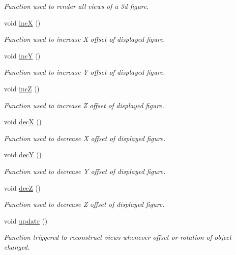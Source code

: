 \begin{DoxyCompactItemize}
\begin{DoxyCompactList}\small\item\em Function used to render all views of a 3d figure. \end{DoxyCompactList}\item 
void \hyperlink{classMainWindow_a6ae88293630f79a3ccb75bc5e64daea5}{incX} ()
\begin{DoxyCompactList}\small\item\em Function used to increase X offset of displayed figure. \end{DoxyCompactList}\item 
void \hyperlink{classMainWindow_ad4fa62f605231f2c935f37f7a204bbf9}{incY} ()
\begin{DoxyCompactList}\small\item\em Function used to increase Y offset of displayed figure. \end{DoxyCompactList}\item 
void \hyperlink{classMainWindow_a25ae6019ab87c5e9bf844ac007b00249}{incZ} ()
\begin{DoxyCompactList}\small\item\em Function used to increase Z offset of displayed figure. \end{DoxyCompactList}\item 
void \hyperlink{classMainWindow_a4c4ad4dbc9064c0bdbdb5f9ba619a6c2}{decX} ()
\begin{DoxyCompactList}\small\item\em Function used to decrease X offset of displayed figure. \end{DoxyCompactList}\item 
void \hyperlink{classMainWindow_aeab655f19703fca45999fc3cb11b6bd0}{decY} ()
\begin{DoxyCompactList}\small\item\em Function used to decrease Y offset of displayed figure. \end{DoxyCompactList}\item 
void \hyperlink{classMainWindow_a5841a993bb0167306794580058c435e2}{decZ} ()
\begin{DoxyCompactList}\small\item\em Function used to decrease Z offset of displayed figure. \end{DoxyCompactList}\item 
void \hyperlink{classMainWindow_a128f71880d4b9683149023fc46fcc9f8}{update} ()
\begin{DoxyCompactList}\small\item\em Function triggered to reconstruct views whenever offset or rotation of object changed. \end{DoxyCompactList}\item 

\end{DoxyCompactItemize}
